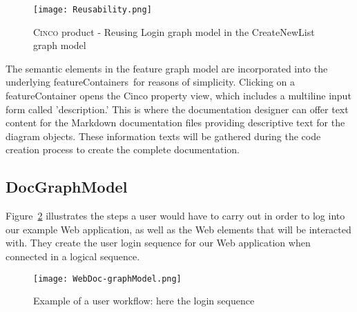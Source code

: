 \begin{figure}[h]
    \centering
    \texttt{[image: Reusability.png]}
    \caption{\textsc{Cinco} product - Reusing Login graph model in the CreateNewList graph model}
    \label{fig:reusability}
\end{figure}

The semantic elements in the feature graph model are incorporated into the underlying featureContainers for reasons of simplicity. Clicking on a featureContainer opens the Cinco property view, which includes a multiline input form called 'description.' This is where the documentation designer can offer text content for the Markdown documentation files providing descriptive text for the diagram objects. These information texts will be gathered during the code creation process to create the complete documentation.

\subsection{DocGraphModel}\label{sec:DocGrahpModElem}

Figure~\ref{fig:loginSeq} illustrates the steps a user would have to carry out in order to log into our example Web application, as well as the Web elements that will be interacted with. They create the user login sequence for our Web application when connected in a logical sequence.

\begin{figure}[h]
    \centering
    \texttt{[image: WebDoc-graphModel.png]}
    \caption{Example of a user workflow: here the login sequence}
    \label{fig:loginSeq}
\end{figure}


